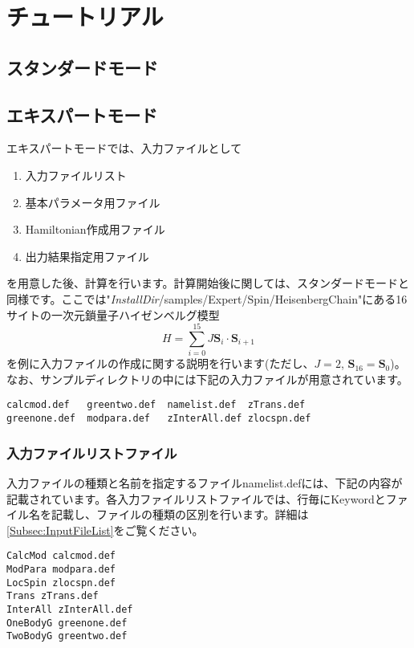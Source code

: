 \chapter{チュートリアル}
\label{Ch:model}
\section{スタンダードモード}
\label{Sec:StandardMode}


\newpage
\section{エキスパートモード}
エキスパートモードでは、入力ファイルとして
\begin{enumerate}
\item 入力ファイルリスト
\item 基本パラメータ用ファイル
\item Hamiltonian作成用ファイル
\item 出力結果指定用ファイル
\end{enumerate}
を用意した後、計算を行います。計算開始後に関しては、スタンダードモードと同様です。ここでは"{\it InstallDir}/samples/Expert/Spin/HeisenbergChain"にある16サイトの一次元鎖量子ハイゼンベルグ模型
\begin{equation}
H=\sum_{i=0}^{15} J {\bm S}_i\cdot {\bm S}_{i+1}
\end{equation}
を例に入力ファイルの作成に関する説明を行います(ただし、$J=2$, ${\bm S}_{16}={\bm S}_{0}$)。なお、サンプルディレクトリの中には下記の入力ファイルが用意されています。\\
\begin{minipage}{15cm}
\begin{screen}
\begin{verbatim}
calcmod.def   greentwo.def  namelist.def  zTrans.def
greenone.def  modpara.def   zInterAll.def zlocspn.def
\end{verbatim}
\end{screen}
\end{minipage}

\subsection{入力ファイルリストファイル}
入力ファイルの種類と名前を指定するファイルnamelist.defには、下記の内容が記載されています。各入力ファイルリストファイルでは、行毎にKeywordとファイル名を記載し、ファイルの種類の区別を行います。詳細は\ref{Subsec:InputFileList}をご覧ください。
\\
\begin{minipage}{15cm}
\begin{screen}
\begin{verbatim}
CalcMod calcmod.def
ModPara modpara.def
LocSpin zlocspn.def
Trans zTrans.def
InterAll zInterAll.def
OneBodyG greenone.def
TwoBodyG greentwo.def
\end{verbatim}
\end{screen}
\end{minipage}

